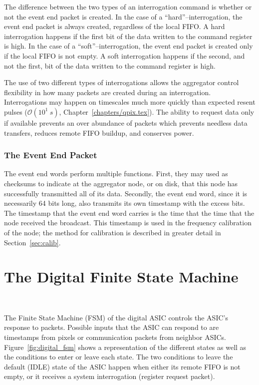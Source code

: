 The difference between the two types of an interrogation command is whether or not the event end packet is created.
In the case of a ``hard''--interrogation, the event end packet is always created, regardless of the local FIFO.
A hard interrogation happens if the first bit of the data written to the command register is high.
In the case of a ``soft''--interrogation, the event end packet is created only if the local FIFO is not empty.
A soft interrogation happens if the second, and not the first, bit of the data written to the command register is high.

The use of two different types of interrogations allows the aggregator control flexibility in how many packets are created during an interrogation.
Interrogations may happen on timescales much more quickly than expected resent pulses ($\mathcal{O}(10^{1}~\unit{s})$, Chapter~\ref{chapters/qpix.tex}).
The ability to request data only if available prevents an over abundance of packets which prevents needless data transfers, reduces remote FIFO buildup, and conserves power.

\subsubsection{The Event End Packet}

The event end words perform multiple functions.
First, they may used as checksums to indicate at the aggregator node, or on disk, that this node has successfully transmitted all of its data.
Secondly, the event end word, since it is necessarily 64 bits long, also transmits its own timestamp with the excess bits.
The timestamp that the event end word carries is the time that the time that the node received the broadcast.
This timestamp is used in the frequency calibration of the node; the method for calibration is described in greater detail in Section~\ref{sec:calib}.

\section{The Digital Finite State Machine}~\label{sec:digital_fsm}

The Finite State Machine (FSM) of the digital ASIC controls the ASIC's response to packets.
Possible inputs that the ASIC can respond to are timestamps from pixels or communication packets from neighbor ASICs.
Figure~\ref{fig:digital_fsm} shows a representation of the different states as well as the conditions to enter or leave each state.
The two conditions to leave the default (IDLE) state of the ASIC happen when either its remote FIFO is not empty, or it receives a system interrogation (register request packet).

